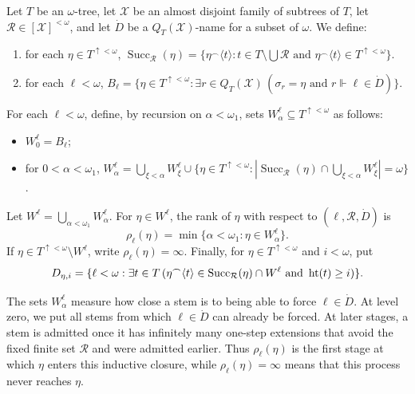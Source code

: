 \begin{definition}\label{def:QT-ranks}
Let $T$ be an $\omega$-tree, let $\mathcal X$ be an almost disjoint family of
subtrees of $T$, let $\mathcal R\in[\mathcal X]^{<\omega}$, and let $\dot D$
be a $Q_T(\mathcal X)$-name for a subset of $\omega$.
We define:
\begin{enumerate}[label=(\arabic*)]
    \item for each $\eta\in T^{\uparrow<\omega}$,
    $\operatorname{Succ}_{\mathcal R}(\eta) =
    \{\eta^\frown\langle t\rangle:
    t\in T\setminus\bigcup\mathcal R
    \text{ and }
    \eta^\frown\langle t\rangle\in T^{\uparrow<\omega}\}$.
    \item for each $\ell<\omega$, $B_\ell=
    \{\eta\in T^{\uparrow<\omega}:\exists r\in Q_T(\mathcal X)\,
    (\sigma_r=\eta\text{ and }r\Vdash\ell\in\dot D)\}$.
\end{enumerate}
For each $\ell<\omega$, define, by recursion on $\alpha<\omega_1$, sets
$W^\ell_\alpha\subseteq T^{\uparrow<\omega}$ as follows:
\begin{itemize}
    \item $W^\ell_0=B_\ell$;
    \item for $0<\alpha<\omega_1$,
    $W^\ell_\alpha
    =
    \bigcup_{\xi<\alpha}W^\ell_\xi\cup
    \{\eta\in T^{\uparrow<\omega}:
      |\operatorname{Succ}_{\mathcal R}(\eta)
        \cap\bigcup_{\xi<\alpha}W^\ell_\xi|=\omega\}$.
\end{itemize}
Let $W^\ell=\bigcup_{\alpha<\omega_1}W^\ell_\alpha$.
For $\eta\in W^\ell$, the rank of $\eta$ with respect to $(\ell,\mathcal R,\dot D)$ is
\[
  \rho_\ell(\eta)
  =
  \min\{\alpha<\omega_1:\eta\in W^\ell_\alpha\}.
\]
If $\eta\in T^{\uparrow<\omega}\setminus W^\ell$, write $\rho_\ell(\eta)=\infty$.
Finally, for $\eta\in T^{\uparrow<\omega}$ and $i<\omega$, put
\[
D_{\eta,i}
=
\{\ell<\omega:
  \exists t\in T\,
  (
    \eta^\frown\langle t\rangle\in
    \operatorname{Succ}_{\mathcal R}(\eta)\cap W^\ell
    \text{ and }
    \operatorname{ht}(t)\geq i
  )\}.
\]
\end{definition}

The sets $W^\ell_\alpha$ measure how close a stem is to being able to force
$\ell\in\dot D$.
At level zero, we put all stems from which $\ell\in\dot D$
can already be forced.
At later stages, a stem is admitted once it has infinitely many one-step
extensions that avoid the fixed finite set $\mathcal R$ and were admitted earlier.
Thus $\rho_\ell(\eta)$ is the
first stage at which $\eta$ enters this inductive closure, while
$\rho_\ell(\eta)=\infty$ means that this process never reaches $\eta$.

